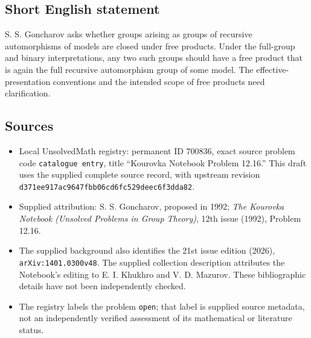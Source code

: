 \documentclass[11pt]{article}
\begin{document}
\subsection{Short English statement}
S. S. Goncharov asks whether groups arising as groups of recursive automorphisms of models are closed under free products. Under the full-group and binary interpretations, any two such groups should have a free product that is again the full recursive automorphism group of some model. The effective-presentation conventions and the intended scope of free products need clarification.
\subsection{Sources}
\begin{itemize}
\item Local UnsolvedMath registry: permanent ID \(700836\), exact source problem code \texttt{catalogue entry}, title ``Kourovka Notebook Problem 12.16.'' This draft uses the supplied complete source record, with upstream revision \texttt{d371ee917ac9647fbb06cd6fc529deec6f3dda82}.
\item Supplied attribution: S. S. Goncharov, proposed in 1992; \emph{The Kourovka Notebook (Unsolved Problems in Group Theory)}, 12th issue (1992), Problem 12.16.
\item The supplied background also identifies the 21st issue edition (2026), \texttt{arXiv:1401.0300v48}. The supplied collection description attributes the Notebook's editing to E. I. Khukhro and V. D. Mazurov. These bibliographic details have not been independently checked.
\item The registry labels the problem \texttt{open}; that label is supplied source metadata, not an independently verified assessment of its mathematical or literature status.
\end{itemize}
\end{document}
